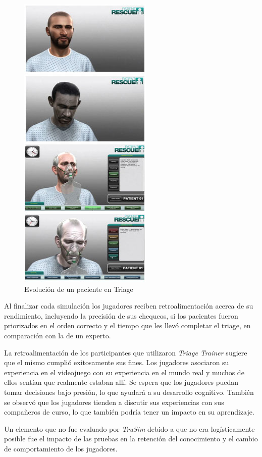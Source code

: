 \begin{figure}[ht!]
\centering 
\includegraphics[scale=0.5]{tics/images/patient_side.jpg}
\caption{Evolución de un paciente en Triage}
\label{fig:triage_patient1}
\end{figure}

Al finalizar cada simulación los jugadores reciben retroalimentación acerca de
su rendimiento, incluyendo la precisión de sus chequeos, si los pacientes fueron
priorizados en el orden correcto y el tiempo que les llevó completar el triage,
en comparación con la de un experto.

La retroalimentación de los participantes que utilizaron \emph{Triage Trainer}
sugiere que el mismo cumplió exitosamente sus fines. Los jugadores asociaron su
experiencia en el videojuego con su experiencia en el mundo real y muchos de
ellos sentían que realmente estaban allí. Se espera que los jugadores puedan
tomar decisiones bajo presión, lo que ayudará a su desarrollo cognitivo. También
se observó que los jugadores tienden a discutir sus experiencias con sus
compañeros de curso, lo que también podría tener un impacto en su aprendizaje.

Un elemento que no fue evaluado por \emph{TruSim} debido a que no era
logísticamente posible fue el impacto de las pruebas en la retención del
conocimiento y el cambio de comportamiento de los
jugadores\cite{education:games}. 


